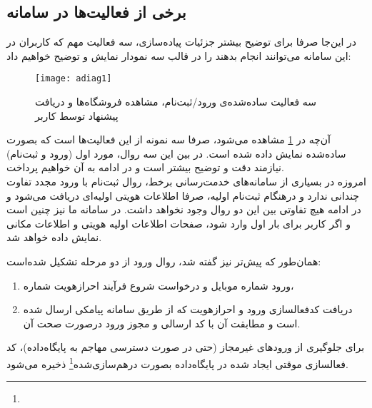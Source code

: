 \newpage

\subsection{برخی از فعالیت‌ها در سامانه}

در این‌جا صرفا برای توضیح بیشتر جزئیات پیاده‌سازی، سه فعالیت مهم که کاربران در این سامانه می‌توانند انجام بدهند را در قالب سه نمودار نمایش و توضیح خواهیم داد:

\begin{figure}[H]
	\centering
	\texttt{[image: adiag1]}
	\caption{سه فعالیت ساده‌شده‌ی ورود/ثبت‌نام، مشاهده فروشگاه‌ها و دریافت پیشنهاد توسط کاربر}
	\label{fig:adiag1}
\end{figure}

آن‌چه در \cref{fig:adiag1} مشاهده می‌شود، صرفا سه نمونه از این فعالیت‌ها است که بصورت ساده‌شده نمایش داده شده است. در بین این سه روال، مورد اول (ورود و ثبت‌نام) نیازمند دقت و توضیح بیشتر است و در ادامه به آن خواهیم پرداخت.\\

امروزه در بسیاری از سامانه‌های خدمت‌رسانی برخط، روال ثبت‌نام با ورود مجدد تفاوت چندانی ندارد و درهنگام ثبت‌نام اولیه، صرفا اطلاعات هویتی اولیه‌ای دریافت می‌شود و در ادامه هیچ تفاوتی بین این دو روال وجود نخواهد داشت. در سامانه ما نیز چنین است و اگر کاربر برای بار اول وارد شود، صفحات اطلاعات اولیه هویتی و اطلاعات مکانی نمایش داده خواهد شد.

\newpage

همان‌طور که پیش‌تر نیز گفته شد، روال ورود از دو مرحله تشکیل شده‌است:
\begin{enumerate}
	\item ورود شماره موبایل و درخواست شروع فرآیند احرازهویت شماره،
	\item دریافت کدفعالسازی ورود و احرازهویت که از طریق سامانه پیامکی ارسال شده است و مطابقت آن با کد ارسالی و مجوز ورود درصورت صحت آن.
\end{enumerate}

برای جلوگیری از ورودهای غیرمجاز (حتی در صورت دسترسی مهاجم به پایگاه‌داده)، کد فعالسازی موقتی ایجاد شده در پایگاه‌داده بصورت درهم‌سازی‌شده\footnote{} ذخیره می‌شود.


